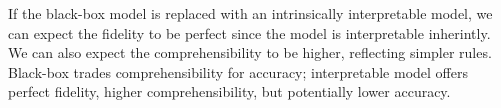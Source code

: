 \documentclass{article}
\theoremstyle{mytheoremstyle}
\theoremstyle{mytheoremstyle}
\theoremstyle{myproblemstyle}
\begin{document}
If the black-box model is replaced with an intrinsically interpretable model, we can expect the fidelity to be perfect since the model is interpretable inherintly. We can also expect the comprehensibility to be higher, reflecting simpler rules. Black-box trades comprehensibility for accuracy; interpretable model offers perfect fidelity, higher comprehensibility, but potentially lower accuracy. 




\end{document}
